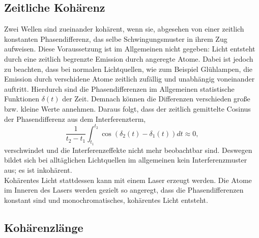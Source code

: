 \subsection{Zeitliche Kohärenz}
Zwei Wellen sind zueinander kohärent, wenn sie, abgesehen von einer zeitlich konstanten Phasendifferenz, das selbe Schwingungsmuster in ihrem Zug aufweisen.
Diese Voraussetzung ist im Allgemeinen nicht gegeben:
Licht entsteht durch eine zeitlich begrenzte Emission durch angeregte Atome.
Dabei ist jedoch zu beachten, dass bei normalen Lichtquellen, wie zum Beispiel Glühlampen, die Emission durch verschidene Atome zeitlich zufällig und unabhängig voneinander auftritt.
Hierdurch sind die Phasendifferenzen im Allgemeinen statistische Funktionen $\delta(t)$ der Zeit.
Demnach können die Differenzen verschieden große bzw. kleine Werte annehmen.
Daraus folgt, dass der zeitlich gemittelte Cosinus der Phasendifferenz aus dem Interferenzterm,
\begin{equation}
  \frac{1}{t_2-t_1} \int_{t_1}^{t_2} \cos{(\delta_2(t)-\delta_1(t))}dt \approx 0,
\end{equation}
verschwindet und die Interferenzeffekte nicht mehr beobachtbar sind.
Deswegen bildet sich bei alltäglichen Lichtquellen im allgemeinen kein Interferenzmuster aus; es ist inkohärent.\\
Kohärentes Licht stattdessen kann mit einem Laser erzeugt werden.
Die Atome im Inneren des Lasers werden gezielt so angeregt, dass die Phasendifferenzen konstant sind und monochromatisches, kohärentes Licht entsteht.

\subsection{Kohärenzlänge}

